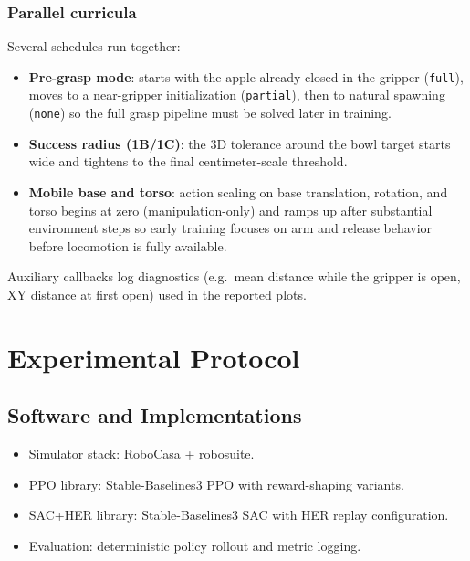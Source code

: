 \documentclass[11pt,a4paper]{article}
\begin{document}
\subsubsection{Parallel curricula}
Several schedules run together:
\begin{itemize}
    \item \textbf{Pre-grasp mode}: starts with the apple already closed in the gripper (\texttt{full}), moves to a near-gripper initialization (\texttt{partial}), then to natural spawning (\texttt{none}) so the full grasp pipeline must be solved later in training.
    \item \textbf{Success radius (1B/1C)}: the 3D tolerance around the bowl target starts wide and tightens to the final centimeter-scale threshold.
    \item \textbf{Mobile base and torso}: action scaling on base translation, rotation, and torso begins at zero (manipulation-only) and ramps up after substantial environment steps so early training focuses on arm and release behavior before locomotion is fully available.
\end{itemize}
Auxiliary callbacks log diagnostics (e.g.\ mean distance while the gripper is open, XY distance at first open) used in the reported plots.

\section{Experimental Protocol}
\subsection{Software and Implementations}
\begin{itemize}
    \item Simulator stack: RoboCasa + robosuite.
    \item PPO library: Stable-Baselines3 PPO with reward-shaping variants.
    \item SAC+HER library: Stable-Baselines3 SAC with HER replay configuration.
    \item Evaluation: deterministic policy rollout and metric logging.
\end{itemize}
\end{document}

